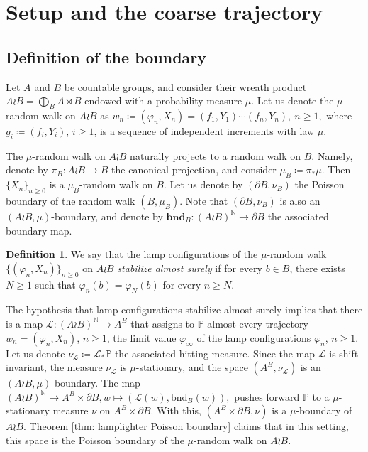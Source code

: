 \documentclass[reqno,oneside,11pt]{amsart}
\renewcommand{\P}{\mathbb{P}}
\theoremstyle{plain}
\theoremstyle{definition}
\newtheorem{defn}[thm]{Definition} %
\begin{document}
\section{Setup and the coarse trajectory}\label{section: the coarse trajectory}
\subsection{Definition of the boundary}\label{subsection: construction of the boundary}

Let $A$ and $B$ be countable groups, and consider their wreath product $A\wr B=\bigoplus_{B}A\rtimes B$ endowed with a probability measure $\mu$. Let us denote the $\mu$-random walk on $A\wr B$ as $w_n\coloneqq (\varphi_n,X_n)=(f_1,Y_1)\cdots (f_n,Y_n), \ n\ge 1,$ where $g_i\coloneqq (f_i,Y_i)$, $i\ge 1$, is a sequence of independent increments with law $\mu$.

The $\mu$-random walk on $A\wr B$ naturally projects to a random walk on $B$. Namely, denote by $\pi_B:A\wr B\to B$ the canonical projection, and consider $\mu_B\coloneqq \pi_{*}\mu$. Then $\{X_n\}_{n\ge 0}$ is a $\mu_B$-random walk on $B$. Let us denote by $(\partial B,\nu_B)$ the Poisson boundary of the random walk $(B,\mu_B)$. Note that $(\partial B,\nu_B)$ is also an $(A\wr B ,\mu)$-boundary, and denote by $\mathbf{bnd}_{B}:(A\wr B)^{\mathbb{N}}\to \partial B$ the associated boundary map.

\begin{defn}\label{def: stabilization of lamps}
	We say that the lamp configurations of the $\mu$-random walk $\{(\varphi_n,X_n)\}_{n\ge 0}$ on $A\wr B$ \emph{stabilize almost surely} if for every $b\in B$, there exists $N\ge 1$ such that $\varphi_n(b)=\varphi_N(b)$ for every $n\ge N$. 
\end{defn}

The hypothesis that lamp configurations stabilize almost surely implies that there is a map $\mathcal{L}:(A\wr B)^{\mathbb{N}}\to A^B$ that assigns to $\P$-almost every trajectory $w_n=(\varphi_n,X_n)$, $n\ge 1$, the limit value $\varphi_{\infty}$ of the lamp configurations $\varphi_n$, $n\ge 1$. Let us denote $\nu_{\mathcal{L}}\coloneqq\mathcal{L}_{*}\P$ the associated hitting measure. Since the map $\mathcal{L}$ is shift-invariant, the measure $\nu_{\mathcal{L}}$ is $\mu$-stationary, and the space $(A^B,\nu_{\mathcal{L}})$ is an $(A\wr B,\mu )$-boundary. The map $
	(A\wr B)^{\mathbb{N}}\to A^B \times \partial B, 
	w\mapsto \left(\mathcal{L}(w),\mathrm{bnd}_B(w)\right),$ pushes forward $\P$ to a $\mu$-stationary measure $\nu$ on $A^B\times \partial B$. With this, $(A^B\times \partial B,\nu)$ is a $\mu$-boundary of $A\wr B$. Theorem \ref{thm: lamplighter Poisson boundary} claims that in this setting, this space is the Poisson boundary of the $\mu$-random walk on $A\wr B$.
\end{document}
